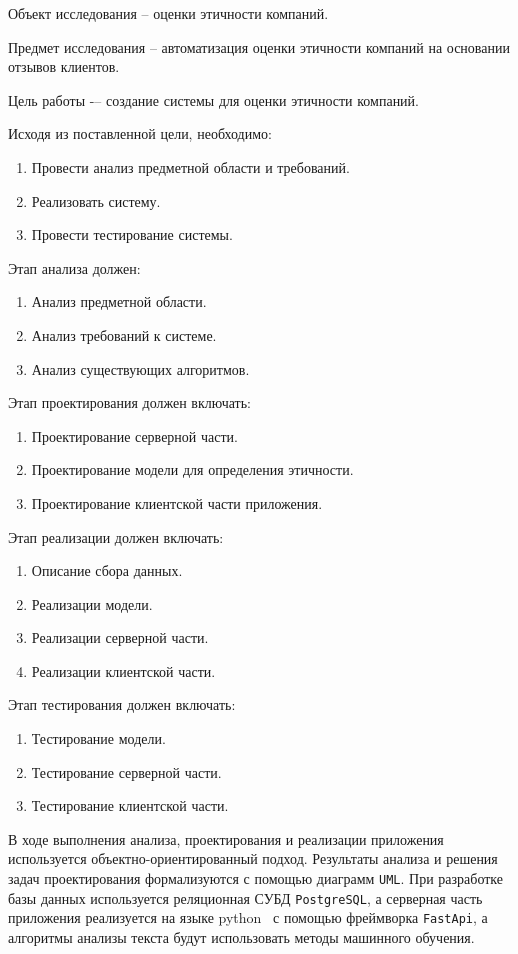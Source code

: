 \documentclass[PI, VKR]{HSEUniversity}
\begin{document}
Объект исследования -- оценки этичности компаний.

Предмет исследования -- автоматизация оценки этичности компаний на основании отзывов клиентов.

Цель работы -– создание системы для оценки этичности компаний.

Исходя из поставленной цели, необходимо:
\begin{enumerate}
\item Провести анализ предметной области и требований.
\item Реализовать систему.
\item Провести тестирование системы.
\end{enumerate}

Этап анализа должен:
\begin{enumerate}
\item Анализ предметной области.
\item Анализ требований к системе.
\item Анализ существующих алгоритмов.
\end{enumerate}

Этап проектирования должен включать:
\begin{enumerate}
\item Проектирование серверной части.
\item Проектирование модели для определения этичности.
\item Проектирование клиентской части приложения.
\end{enumerate}

Этап реализации должен включать:
\begin{enumerate}
\item Описание сбора данных.
\item Реализации модели.
\item Реализации серверной части.
\item Реализации клиентской части.
\end{enumerate}

Этап тестирования должен включать:
\begin{enumerate}
\item Тестирование модели.
\item Тестирование серверной части.
\item Тестирование клиентской части.
\end{enumerate}

В ходе выполнения анализа, проектирования и реализации приложения используется объектно-ориентированный подход. Результаты анализа и решения задач проектирования формализуются с помощью диаграмм \texttt{UML}. При разработке базы данных используется реляционная СУБД \texttt{PostgreSQL}, а серверная часть приложения реализуется на языке python~\autocite{vanrossum_python_2009} с помощью фреймворка \texttt{FastApi}, а алгоритмы анализы текста будут использовать методы машинного обучения.
\end{document}
